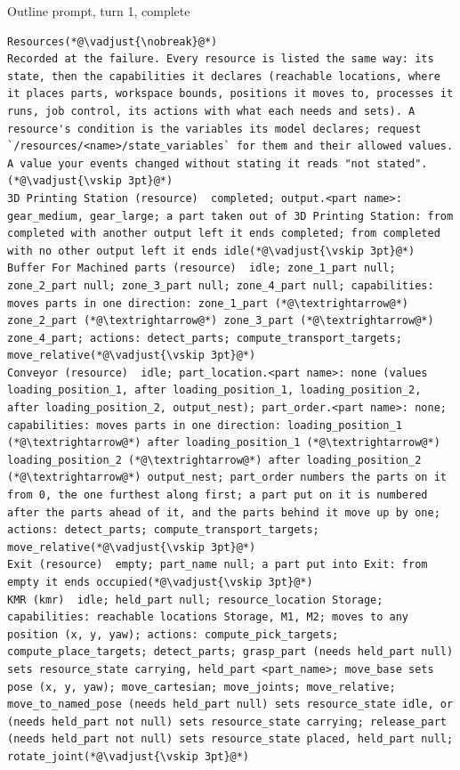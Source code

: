 \documentclass[preprint,12pt,authoryear]{elsarticle}
\begin{document}
\begin{fullbox}{Outline prompt, turn 1, complete}
\begin{lstlisting}[showlines=true]
Resources(*@\vadjust{\nobreak}@*)
Recorded at the failure. Every resource is listed the same way: its state, then the capabilities it declares (reachable locations, where it places parts, workspace bounds, positions it moves to, processes it runs, job control, its actions with what each needs and sets). A resource's condition is the variables its model declares; request `/resources/<name>/state_variables` for them and their allowed values. A value your events changed without stating it reads "not stated".(*@\vadjust{\vskip 3pt}@*)
3D Printing Station (resource)  completed; output.<part name>: gear_medium, gear_large; a part taken out of 3D Printing Station: from completed with another output left it ends completed; from completed with no other output left it ends idle(*@\vadjust{\vskip 3pt}@*)
Buffer For Machined parts (resource)  idle; zone_1_part null; zone_2_part null; zone_3_part null; zone_4_part null; capabilities: moves parts in one direction: zone_1_part (*@\textrightarrow@*) zone_2_part (*@\textrightarrow@*) zone_3_part (*@\textrightarrow@*) zone_4_part; actions: detect_parts; compute_transport_targets; move_relative(*@\vadjust{\vskip 3pt}@*)
Conveyor (resource)  idle; part_location.<part name>: none (values loading_position_1, after loading_position_1, loading_position_2, after loading_position_2, output_nest); part_order.<part name>: none; capabilities: moves parts in one direction: loading_position_1 (*@\textrightarrow@*) after loading_position_1 (*@\textrightarrow@*) loading_position_2 (*@\textrightarrow@*) after loading_position_2 (*@\textrightarrow@*) output_nest; part_order numbers the parts on it from 0, the one furthest along first; a part put on it is numbered after the parts ahead of it, and the parts behind it move up by one; actions: detect_parts; compute_transport_targets; move_relative(*@\vadjust{\vskip 3pt}@*)
Exit (resource)  empty; part_name null; a part put into Exit: from empty it ends occupied(*@\vadjust{\vskip 3pt}@*)
KMR (kmr)  idle; held_part null; resource_location Storage; capabilities: reachable locations Storage, M1, M2; moves to any position (x, y, yaw); actions: compute_pick_targets; compute_place_targets; detect_parts; grasp_part (needs held_part null) sets resource_state carrying, held_part <part_name>; move_base sets pose (x, y, yaw); move_cartesian; move_joints; move_relative; move_to_named_pose (needs held_part null) sets resource_state idle, or (needs held_part not null) sets resource_state carrying; release_part (needs held_part not null) sets resource_state placed, held_part null; rotate_joint(*@\vadjust{\vskip 3pt}@*)

\end{lstlisting}
\end{fullbox}
\end{document}
